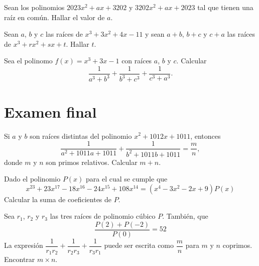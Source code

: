     \begin{section-problem}
        Sean los polinomios $2023x^2 + ax + 3202$ y $3202x^2 + ax + 2023$ tal que tienen una raíz en común.
        Hallar el valor de $a$.
    \end{section-problem}

    \begin{section-problem}
        Sean $a$, $b$ y $c$ las raíces de $x^3 + 3x^2 + 4x - 11$ y sean $a + b$, $b + c$ y $c + a$ las raíces de $x^3 + rx^2 + sx + t$.
        Hallar $t$.
    \end{section-problem}

    \begin{section-problem}
        Sea el polinomo $f(x) = x^3 + 3x - 1$ con raíces $a$, $b$ y $c$.
        Calcular
        \[\frac{1}{a^3 + b^3} + \frac{1}{b^3 + c^3} + \frac{1}{c^3 + a^3}.\]
    \end{section-problem}

\section{Examen final}

    \begin{section-problem}
        Si $a$ y $b$ son raíces distintas del polinomio $x^2 + 1012x + 1011$, entonces
        \[\frac{1}{a^2 + 1011a + 1011} + \frac{1}{b^2 + 1011b + 1011} = \frac{m}{n},\]
        donde $m$ y $n$ son primos relativos.
        Calcular $m + n$.
    \end{section-problem}

    \begin{section-problem}
        Dado el polinomio $P(x)$ para el cual se cumple que
        \[x^{23} + 23x^{17} - 18x^{16} - 24x^{15} + 108x^{14} = (x^4 - 3x^2 - 2x + 9)P(x)\]
        Calcular la suma de coeficientes de $P$.
    \end{section-problem}

    \begin{section-problem}
        Sea $r_1$, $r_2$ y $r_3$ las tres raíces de polinomio cúbico $P$.
        También, que
        \[\frac{P(2) + P(-2)}{P(0)} = 52\]
        La expresión $\dfrac{1}{r_1 r_2} + \dfrac{1}{r_2 r_3} + \dfrac{1}{r_3 r_1}$ puede ser escrita como $\dfrac{m}{n}$ para $m$ y $n$ coprimos.
        Encontrar $m\times n$.
    \end{section-problem}